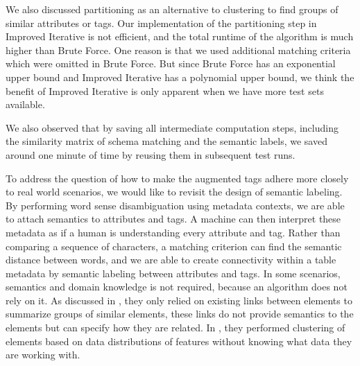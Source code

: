 We also discussed partitioning as an alternative to clustering to find groups of similar attributes or tags. Our implementation of the partitioning step in Improved Iterative is not efficient, and the total runtime of the algorithm is much higher than Brute Force. One reason is that we used additional matching criteria which were omitted in Brute Force. But since Brute Force has an exponential upper bound and Improved Iterative has a polynomial upper bound, we think the benefit of Improved Iterative is only apparent when we have more test sets available.

We also observed that by saving all intermediate computation steps, including the similarity matrix of schema matching and the semantic labels, we saved around one minute of time by reusing them in subsequent test runs.

To address the question of how to make the augmented tags adhere more closely to real world scenarios, we would like to revisit the design of semantic labeling. By performing word sense disambiguation using metadata contexts, we are able to attach semantics to attributes and tags. A machine can then interpret these metadata as if a human is understanding every attribute and tag. Rather than comparing a sequence of characters, a matching criterion can find the semantic distance between words, and we are able to create connectivity within a table metadata by semantic labeling between attributes and tags. In some scenarios, semantics and domain knowledge is not required, because an algorithm does not rely on it. As discussed in \cite{Yu2006Schema}, they only relied on existing links between elements to summarize groups of similar elements, these links do not provide semantics to the elements but can specify how they are related. In \cite{LI200049}, they performed clustering of elements based on data distributions of features without knowing what data they are working with.

